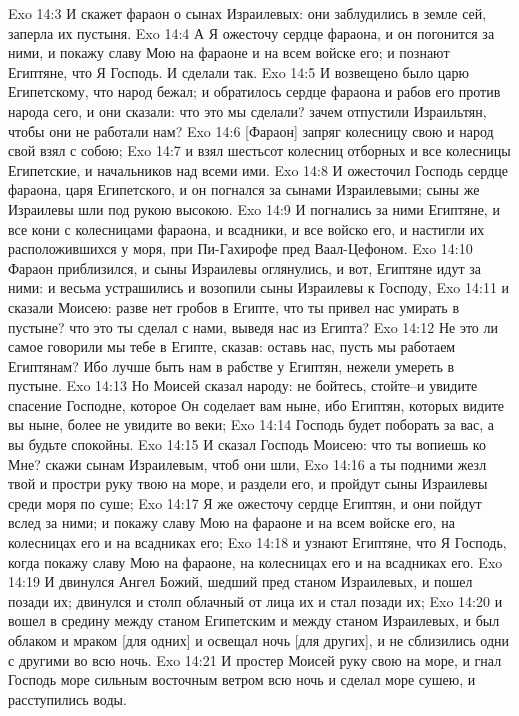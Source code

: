 Exo 14:3  И скажет фараон о сынах Израилевых: они заблудились в земле сей, заперла их пустыня.
Exo 14:4  А Я ожесточу сердце фараона, и он погонится за ними, и покажу славу Мою на фараоне и на всем войске его; и познают Египтяне, что Я Господь. И сделали так.
Exo 14:5  И возвещено было царю Египетскому, что народ бежал; и обратилось сердце фараона и рабов его против народа сего, и они сказали: что это мы сделали? зачем отпустили Израильтян, чтобы они не работали нам?
Exo 14:6  [Фараон] запряг колесницу свою и народ свой взял с собою;
Exo 14:7  и взял шестьсот колесниц отборных и все колесницы Египетские, и начальников над всеми ими.
Exo 14:8  И ожесточил Господь сердце фараона, царя Египетского, и он погнался за сынами Израилевыми; сыны же Израилевы шли под рукою высокою.
Exo 14:9  И погнались за ними Египтяне, и все кони с колесницами фараона, и всадники, и все войско его, и настигли их расположившихся у моря, при Пи-Гахирофе пред Ваал-Цефоном.
Exo 14:10  Фараон приблизился, и сыны Израилевы оглянулись, и вот, Египтяне идут за ними: и весьма устрашились и возопили сыны Израилевы к Господу,
Exo 14:11  и сказали Моисею: разве нет гробов в Египте, что ты привел нас умирать в пустыне? что это ты сделал с нами, выведя нас из Египта?
Exo 14:12  Не это ли самое говорили мы тебе в Египте, сказав: оставь нас, пусть мы работаем Египтянам? Ибо лучше быть нам в рабстве у Египтян, нежели умереть в пустыне.
Exo 14:13  Но Моисей сказал народу: не бойтесь, стойте--и увидите спасение Господне, которое Он соделает вам ныне, ибо Египтян, которых видите вы ныне, более не увидите во веки;
Exo 14:14  Господь будет поборать за вас, а вы будьте спокойны.
Exo 14:15  И сказал Господь Моисею: что ты вопиешь ко Мне? скажи сынам Израилевым, чтоб они шли,
Exo 14:16  а ты подними жезл твой и простри руку твою на море, и раздели его, и пройдут сыны Израилевы среди моря по суше;
Exo 14:17  Я же ожесточу сердце Египтян, и они пойдут вслед за ними; и покажу славу Мою на фараоне и на всем войске его, на колесницах его и на всадниках его;
Exo 14:18  и узнают Египтяне, что Я Господь, когда покажу славу Мою на фараоне, на колесницах его и на всадниках его.
Exo 14:19  И двинулся Ангел Божий, шедший пред станом Израилевых, и пошел позади их; двинулся и столп облачный от лица их и стал позади их;
Exo 14:20  и вошел в средину между станом Египетским и между станом Израилевых, и был облаком и мраком [для одних] и освещал ночь [для других], и не сблизились одни с другими во всю ночь.
Exo 14:21  И простер Моисей руку свою на море, и гнал Господь море сильным восточным ветром всю ночь и сделал море сушею, и расступились воды.
